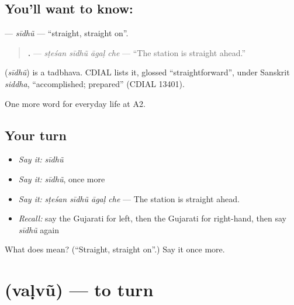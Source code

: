 \subsection*{You'll want to know: }
\textbf{} — \emph{sīdhũ} — \textquotedblleft{}straight, straight on\textquotedblright{}.

\begin{quote}
\textbf{   .} — \emph{sṭeśan sīdhũ āgaḷ che} — \textquotedblleft{}The station is straight ahead.\textquotedblright{}
\end{quote}

\begin{cousinweb}
\textbf{} (\emph{sīdhũ}) is a tadbhava. CDIAL lists it, glossed \textquotedblleft{}straightforward\textquotedblright{}, under Sanskrit \emph{siddha}, \textquotedblleft{}accomplished; prepared\textquotedblright{} (CDIAL 13401).
\end{cousinweb}

\begin{grammarlens}[title={What you've built}]
One more word for everyday life at A2.
\end{grammarlens}

\subsection*{Your turn}
\begin{itemize}
\raggedright
  \item \emph{Say it:} \emph{sīdhũ}
  \item \emph{Say it:} \emph{sīdhũ}, once more
  \item \emph{Say it:} \emph{sṭeśan sīdhũ āgaḷ che} — The station is straight ahead.
  \item \emph{Recall:} say the Gujarati for left, then the Gujarati for right-hand, then say \emph{sīdhũ} again
\end{itemize}

\begin{tcolorbox}[breakable,colback=teal!4,colframe=teal!35!black,title={Before you move on}]
What does  mean? (\textquotedblleft{}Straight, straight on\textquotedblright{}.) Say it once more.
\end{tcolorbox}
\section[\texorpdfstring{\gu{વળવું} (vaḷvũ)}{વળવું (vaḷvũ)}]{ (vaḷvũ) — to turn}

